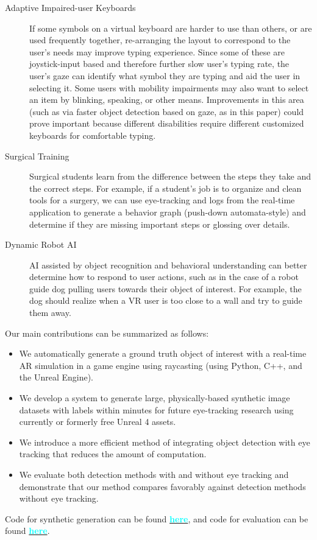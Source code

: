 \begin{description}
    \item[Adaptive Impaired-user Keyboards]
        If some symbols on a virtual keyboard are harder to use than others, or
        are used frequently together, re-arranging the layout to correspond to
        the user's needs may improve typing experience. Since some of these are
        joystick-input based and therefore further slow user's typing rate, the
        user's gaze can identify what symbol they are typing and aid the user in
        selecting it. Some users with mobility impairments may also want to
        select an item by blinking, speaking, or other means. Improvements in
        this area (such as via faster object detection based on gaze, as in this
        paper) could prove important because different disabilities require
        different customized keyboards for comfortable typing.
    \item[Surgical Training]
        Surgical students learn from the difference between the steps they take
        and the correct steps. For example, if a student's job is to organize
        and clean tools for a surgery, we can use eye-tracking and logs from the
        real-time application to generate a behavior graph (push-down
        automata-style) and determine if they are missing important steps or
        glossing over details.
    \item[Dynamic Robot AI]
        AI assisted by object recognition and behavioral understanding can
        better determine how to respond to user actions, such as in the case of
        a robot guide dog pulling users towards their object of interest. For
        example, the dog should realize when a VR user is too close to a wall
        and try to guide them away.
\end{description}

Our main contributions can be summarized as follows:

\begin{itemize}  [noitemsep]
    \item
        We automatically generate a ground truth object of interest with a
        real-time AR simulation in a game engine using raycasting
        (using Python, C++, and the Unreal Engine).
    \item
        We develop a system to generate large, physically-based synthetic image datasets with labels within minutes for future eye-tracking research using currently or formerly free Unreal 4 assets.
    \item
        We introduce a more efficient method of integrating object detection
        with eye tracking that reduces the amount of computation.
    \item
        We evaluate both detection methods with and without eye tracking and
        demonstrate that our method compares favorably against detection methods
        without eye tracking.
\end{itemize}

Code for synthetic generation can be found
\textbf{\href{https://github.com/nrewkowski/COMP755FinalProject}{\textcolor{cyan}{here}}},
and code for evaluation can be found
\textbf{\href{https://github.com/FloralZhao/Comp755Project}{\textcolor{cyan}{here}}}.

